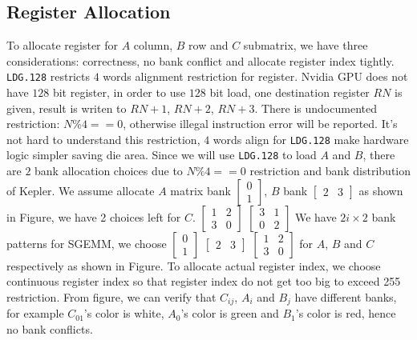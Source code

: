 \documentclass{sig-alternate-05-2015}
\begin{document}
\subsection{Register Allocation}

To allocate register for $A$ column, $B$ row and $C$ submatrix, we have three considerations: correctness, no bank
conflict and allocate register index tightly.
{\tt LDG.128} restricts $4$ words alignment restriction for register.
Nvidia GPU does not have $128$ bit register, in order to use $128$ bit load, one destination register $RN$ is given, result is writen to
$RN+1$, $RN+2$, $RN+3$. There is undocumented restriction: $N\%4==0$, otherwise illegal instruction error will be reported.
It's not hard to understand this restriction, $4$ words align for {\tt LDG.128} make hardware logic simpler saving die area.
Since we will use {\tt LDG.128} to load $A$ and $B$, there are $2$ bank allocation choices due to $N\%4==0$ restriction and
bank distribution of Kepler. We assume allocate $A$ matrix bank $\begin{bmatrix} 0 \\ 1  \end{bmatrix}$,
$B$ bank $\begin{bmatrix} 2 & 3 \end{bmatrix}$ as shown in Figure, we have 2 choices left for $C$.
$\begin{bmatrix} 1 & 2 \\ 3 & 0  \end{bmatrix}$
$\begin{bmatrix} 3 & 1 \\ 0 & 2  \end{bmatrix}$
We have $2i\times2$ bank patterns for SGEMM, we choose $\begin{bmatrix} 0 \\ 1  \end{bmatrix}$ $\begin{bmatrix} 2 & 3 \end{bmatrix}$
$\begin{bmatrix} 1 & 2 \\ 3 & 0  \end{bmatrix}$ for $A$, $B$ and $C$ respectively as shown in Figure.
To allocate actual register index, we choose continuous register index so that register index do not get too big to
exceed 255 restriction. From figure, we can verify that $C_{ij}$, $A_i$ and $B_j$ have different banks, for example
$C_{01}$'s color is white, $A_0$'s color is green and $B_1$'s color is red, hence no bank conflicts.
\end{document}

